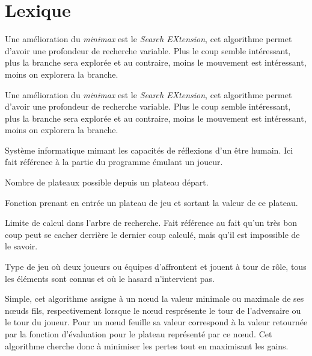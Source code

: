 \documentclass[a4paper]{article}
\begin{document}
\newpage
\appendix
\section{Lexique}
	\begin{description}[style=nextline]
		\item[Algorithme Search EXtension] Une amélioration du \emph{minimax} est le \emph{Search EXtension},
		cet algorithme permet d'avoir une profondeur de recherche variable. Plus le coup semble intéressant, plus
		la branche sera explorée et au contraire, moins le mouvement est intéressant, moins on explorera la branche.

		\item[\'Elagage Alpha-Beta] Une amélioration du \emph{minimax} est le \emph{Search EXtension},
		cet algorithme permet d'avoir une profondeur de recherche variable. Plus le coup semble intéressant, plus
		la branche sera explorée et au contraire, moins le mouvement est intéressant, moins on explorera la branche.

		\item[Intelligence artificielle] Système informatique mimant les capacités de réflexions
		d'un être humain. Ici fait référence à la partie du programme émulant un joueur.

		\item[Facteur de branchement] Nombre de plateaux possible depuis un plateau départ.

		\item[Fonction d'évaluation] Fonction prenant en entrée un plateau de jeu et sortant la valeur de
		ce plateau.

		\item[Horizon] Limite de calcul dans l'arbre de recherche. Fait référence au fait qu'un très bon coup peut
		se cacher derrière le dernier coup calculé, mais qu'il est impossible de le savoir.

		\item[Jeu combinatoire abstrait] Type de jeu où deux joueurs ou équipes d'affrontent et jouent à tour de rôle,
		tous les éléments sont connus et où le hasard n'intervient pas.

		\item[Minimax] Simple, cet algorithme assigne à un n\oe{}ud la valeur minimale ou maximale de ses
		n\oe{}uds fils, respectivement lorsque le n\oe{}ud resprésente le tour de l'adversaire ou le tour
		du joueur. Pour un n\oe{}ud feuille sa valeur correspond à la valeur retournée par la fonction
		d'évaluation pour le plateau représenté par ce n\oe{}ud. Cet algorithme cherche donc à minimiser
		les pertes tout en maximisant les gains.


\end{description}
\end{document}
